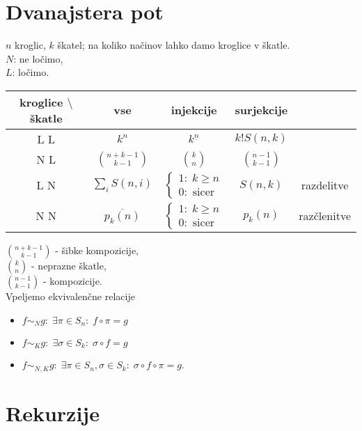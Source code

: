 \documentclass[a4paper, 12pt]{book}
\theoremstyle{definition}
\theoremstyle{remark}
\begin{document}
\section{Dvanajstera pot}

$n$ kroglic, $k$ škatel; na koliko načinov lahko damo kroglice v škatle. \\
$N$: ne ločimo, \\
$L$: ločimo.
\begin{center}
  \begin{tabular}{c | c | c | c | c}
    kroglice $\setminus$ škatle & vse & injekcije & surjekcije & \\
    \hline
    L L & $k^n$ & $k^{\underline{n}}$ & $k! S(n,k)$ & \\
    N L & $\binom{n+k-1}{k-1}$ & $\binom{k}{n}$ & $\binom{n-1}{k-1}$ & \\
    L N & $\sum_i S(n,i)$ & $\begin{cases}1: \; k \geq n \\ 0: \text{ sicer} \end{cases}$ & $S(n,k)$ & razdelitve \\
    N N & $\overline{p_k(n)}$ & $\begin{cases}1: \; k \geq n \\ 0: \text{ sicer} \end{cases}$ & $p_k(n)$ & razčlenitve
  \end{tabular}
\end{center}
$\binom{n+k-1}{k-1}$ - šibke kompozicije, \\
$\binom{k}{n}$ - neprazne škatle, \\
$\binom{n-1}{k-1}$ - kompozicije. \\
Vpeljemo ekvivalenčne relacije
\begin{itemize}
  \item $f \sim_N g: \; \exists \pi \in S_n: \; f \circ \pi = g$
  \item $f \sim_K g: \; \exists \sigma \in S_k: \; \sigma \circ f = g$
  \item $f \sim_{N,K} g: \; \exists \pi \in S_n, \sigma \in S_k: \; \sigma \circ f \circ \pi = g$.
\end{itemize}


\section{Rekurzije}
\end{document}
